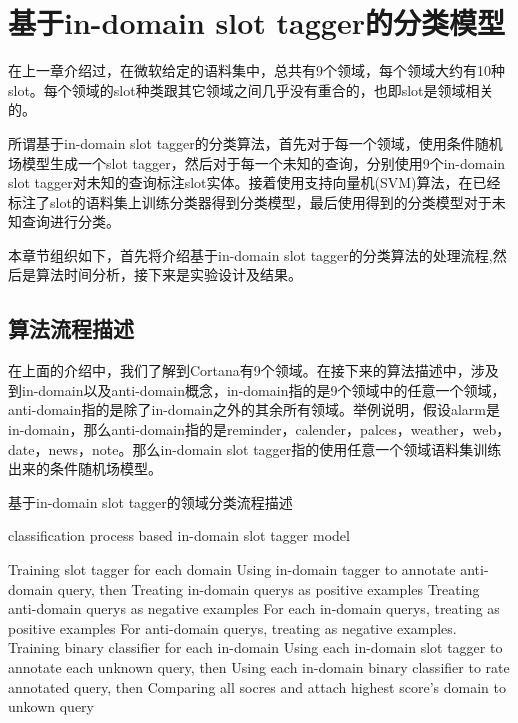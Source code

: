 \documentclass[master]{njuthesis}
\begin{document}
\section{基于in-domain slot tagger的分类模型}

    在上一章介绍过，在微软给定的语料集中，总共有9个领域，每个领域大约有10种slot。每个领域的slot种类跟其它领域之间几乎没有重合的，也即slot是领域相关的。

    所谓基于in-domain slot tagger的分类算法，首先对于每一个领域，使用条件随机场模型生成一个slot tagger，然后对于每一个未知的查询，分别使用9个in-domain slot tagger对未知的查询标注slot实体。接着使用支持向量机(SVM)算法，在已经标注了slot的语料集上训练分类器得到分类模型，最后使用得到的分类模型对于未知查询进行分类。
    
    本章节组织如下，首先将介绍基于in-domain slot tagger的分类算法的处理流程,然后是算法时间分析，接下来是实验设计及结果。

\subsection{算法流程描述}

    在上面的介绍中，我们了解到Cortana有9个领域。在接下来的算法描述中，涉及到in-domain以及anti-domain概念，in-domain指的是9个领域中的任意一个领域，anti-domain指的是除了in-domain之外的其余所有领域。举例说明，假设alarm是in-domain，那么anti-domain指的是reminder，calender，palces，weather，web，date，news，note。那么in-domain slot tagger指的使用任意一个领域语料集训练出来的条件随机场模型。

    基于in-domain slot tagger的领域分类流程描述
    \begin{algorithm}
      \caption{classification process based in-domain slot tagger model}\label{IDST}
      \begin{algorithmic}[1]
       \State Training slot tagger for each domain
      \EndProcedure
       \State Using in-domain tagger to annotate anti-domain query, then
       \State Treating in-domain querys as positive examples
       \State Treating anti-domain querys as negative examples
      \EndProcedure
       \State For each in-domain querys, treating as positive examples
       \State For anti-domain querys, treating as negative examples.
       \State Training binary classifier for each in-domain
      \EndProcedure
       \State Using each in-domain slot tagger to annotate each unknown query, then
       \State Using each in-domain binary classifier to rate annotated query, then
       \State Comparing all socres and attach highest score's domain to unkown query
      \EndProcedure
      \end{algorithmic}
   \end{algorithm}
\end{document}
